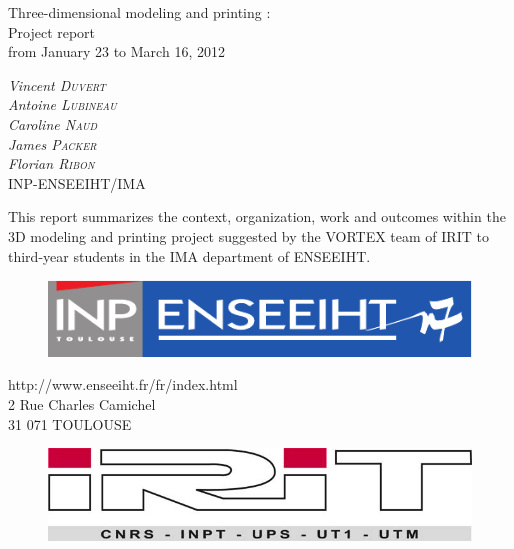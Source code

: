 \documentclass{report}
\begin{document}
\bigskip
\bigskip
\bigskip
\bigskip
\bigskip
\bigskip
\bigskip
\bigskip

\begin{center}
\huge{Three-dimensional modeling and printing :\\ Project report\\}
\bigskip
\bigskip
\Large{from January 23 to March 16, 2012}
\end{center}

\bigskip
\bigskip

\begin{center}
\large{
\textit{Vincent \textsc{Duvert} \\
Antoine \textsc{Lubineau} \\
Caroline \textsc{Naud} \\
James \textsc{Packer} \\
Florian \textsc{Ribon}} \\
\bigskip
INP-ENSEEIHT/IMA 
}
\end{center}

\bigskip
\bigskip

	This report summarizes the context, organization, work and outcomes within the 3D modeling and printing project suggested by the VORTEX team of IRIT to third-year students in the IMA department of ENSEEIHT.

\bigskip
\bigskip

\begin{figure}[!h]
\begin{center}
	\includegraphics[scale=0.4]{inp-enseeiht}
\end{center}
\end{figure}

\bigskip

\begin{center}
http://www.enseeiht.fr/fr/index.html \\
2 Rue Charles Camichel \\
31 071 TOULOUSE
\end{center}

\bigskip

\begin{figure}[!h]
\begin{center}
	\includegraphics[scale=0.4]{irit}
\end{center}
\end{figure}
\end{document}
